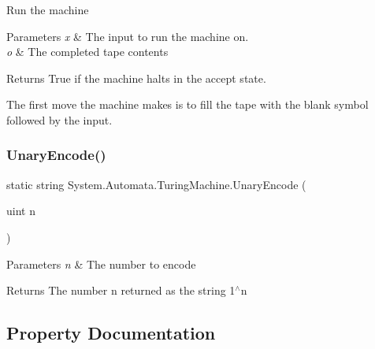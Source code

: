 Run the machine 


\begin{DoxyParams}{Parameters}
{\em x} & The input to run the machine on.\\
\hline
{\em o} & The completed tape contents\\
\hline
\end{DoxyParams}
\begin{DoxyReturn}{Returns}
True if the machine halts in the accept state.
\end{DoxyReturn}


The first move the machine makes is to fill the tape with the blank symbol followed by the input.\mbox{\label{class_system_1_1_automata_1_1_turing_machine_ad62c28bec4c48435a98b4eb5edb89487}} 
\subsubsection{\texorpdfstring{Unary\+Encode()}{UnaryEncode()}}
{\footnotesize\ttfamily static string System.\+Automata.\+Turing\+Machine.\+Unary\+Encode (\begin{DoxyParamCaption}\item[{uint}]{n }\end{DoxyParamCaption})\hspace{0.3cm}{\ttfamily [static]}}


\begin{DoxyParams}{Parameters}
{\em n} & The number to encode\\
\hline
\end{DoxyParams}
\begin{DoxyReturn}{Returns}
The number n returned as the string 1$^\wedge$n
\end{DoxyReturn}


\subsection{Property Documentation}
\mbox{\label{class_system_1_1_automata_1_1_turing_machine_a6f92addf3d029757073431b5b4758cdb}} 
